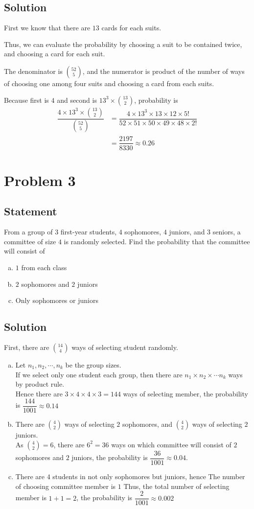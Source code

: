 \documentclass[12pt]{article}
\theoremstyle{plain}
\begin{document}
\subsection*{Solution}
First we know that there are $13$ cards for each suits.
\par Thus, we can evaluate the probability by choosing a suit to be contained twice, and choosing a card for each suit.
\par The denominator is $\binom{52}{5}$, and the numerator is product of the number of ways of choosing one among four suits and choosing a card from each suits.
\par Because first is $4$ and second is $13^3\times \binom{13}{2}$, probability is
$$\begin{aligned}
	\dfrac{4\times 13^3\times \binom{13}{2}}{\binom{52}{5}}&=\dfrac{4\times13^3\times13\times12\times5!}{52\times51\times50\times49\times48\times2!}
	\\&=\dfrac{2197}{8330}\approx0.26
\end{aligned}$$
\newpage
\section*{Problem 3}
\subsection*{Statement}
From a group of $3$ first-year students, $4$ sophomores, $4$ juniors, and $3$ seniors, a committee of size $4$ is randomly selected. Find the probability that the committee will consist of
\begin{enumerate}[(a)]
	\item $1$ from each class
	\item $2$ sophomores and $2$ juniors
	\item Only sophomores or juniors
\end{enumerate}
\subsection*{Solution}
First, there are $\binom{14}{4}$ ways of selecting student randomly.
\begin{enumerate}[(a)]
	\item Let $n_1,n_2,\cdots,n_k$ be the group sizes.
	\\ If we select only one student each group, then there are $n_1\times n_2\times \cdots n_k$ ways by product rule.
	\\ Hence there are $3\times 4\times 4\times 3=144$ ways of selecting member, the probability is $\dfrac{144}{1001}\approx0.14$
	\item There are $\binom{4}{2}$ ways of selecting $2$ sophomores, and $\binom{4}{2}$ ways of selecting $2$ juniors.
	\\ As $\binom{4}{2}=6$, there are $6^2=36$ ways on which committee will consist of $2$ sophomores and $2$ juniors, the probability is $\dfrac{36}{1001}\approx0.04$.
	\item There are $4$ students in not only sophomores but juniors, hence The number of choosing committee member is $1$
	Thus, the total number of selecting member is $1+1=2$, the probability is $\dfrac{2}{1001}\approx0.002$
\end{enumerate}
\newpage
\end{document}
